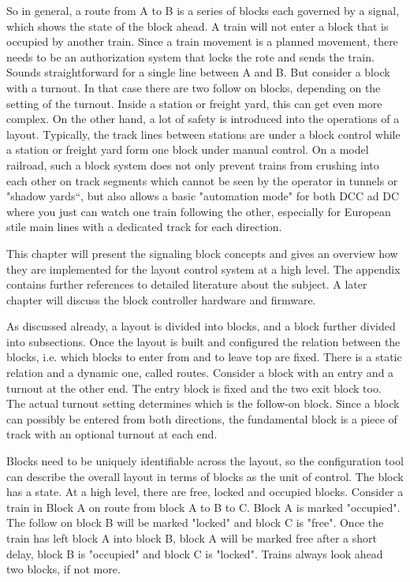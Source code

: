 So in general, a route from A to B is a series of blocks each governed by a signal, which shows the state of the block ahead. A train will not enter a block that is occupied by another train. Since a train movement is a planned movement, there needs to be an authorization system that locks the rote and sends the train. Sounds straightforward for a single line between A and B. But consider a block with a turnout. In that case there are two follow on blocks, depending on the setting of the turnout. Inside a station or freight yard, this can get even more complex. On the other hand, a lot of safety is introduced into the operations of a layout. Typically, the track lines between stations are under a block control while a station or freight yard form one block under manual control. On a model railroad, such a block system does not only prevent trains from crushing into each other on track segments which cannot be seen by the operator in tunnels or "shadow yards“, but also allows a basic "automation mode" for both DCC ad DC where you just can watch one train following the other, especially for European stile main lines with a dedicated track for each direction.

This chapter will present the signaling block concepts and gives an overview how they are implemented for the layout control system at a high level. The appendix contains further references to detailed literature about the subject. A later chapter will discuss the block controller hardware and firmware.


As discussed already, a layout is divided into blocks, and a block further divided into subsections. Once the layout is built and configured the relation between the blocks, i.e. which blocks to enter from and to leave top are fixed. There is a static relation and a dynamic one, called routes. Consider a block with an entry and a turnout at the other end. The entry block is fixed and the two exit block too. The actual turnout setting determines which is the follow-on block. Since a block can possibly be entered from both directions, the fundamental block is a piece of track with an optional turnout at each end.

Blocks need to be uniquely identifiable across the layout, so the configuration tool can describe the overall layout in terms of blocks as the unit of control. The block has a state. At a high level, there are free, locked and occupied blocks. Consider a train in Block A on route from block A to B to C. Block A is marked "occupied". The follow on block B will be marked "locked" and block C is "free". Once the train has left block A into block B, block A will be marked free after a short delay, block B is "occupied" and block C is "locked". Trains always look ahead two blocks, if not more.

